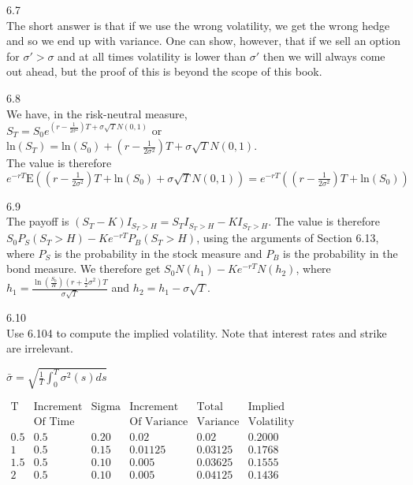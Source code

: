 6.7 \\
The short answer is that if we use the wrong volatility, we get the wrong hedge and so we end up with variance. One can show, however, that if we sell an option for $\sigma ' > \sigma$ and at all times volatility is lower than $\sigma '$ then we will always come out ahead, but the proof of this is beyond the scope of this book.

6.8 \\
We have, in the risk-neutral measure, \\
$S_T = S_0 e^{\left(r-\frac{1}{2 \sigma^2}  \right) T + \sigma \sqrt{T} N(0,1)}$ or \\
$\text{ln}(S_T) = \text{ln} (S_0) + \left(r-\frac{1}{2 \sigma^2}  \right) T + \sigma \sqrt{T} N(0,1)$. \\
The value is therefore \\
$e^{-rT} \text{E} \left( \left(r-\frac{1}{2 \sigma^2}  \right) T + \text{ln}(S_0) + \sigma \sqrt{T} N(0,1) \right) = e^{-rT} \left( \left(r-\frac{1}{2 \sigma^2}  \right) T + \text{ln}(S_0) \right)$

6.9 \\
The payoff is $(S_T - K)I_{S_T > H} = S_T I_{S_T > H} - K I_{S_T > H}$. The value is therefore $S_0 P_S (S_T > H) - K e^{-rT} P_B (S_T > H)$, using the arguments of Section 6.13, where $P_S$ is the probability in the stock measure and $P_B$ is the probability in the bond measure. We therefore get $S_0 N(h_1) - Ke^{-rT} N(h_2)$, where $h_1 = \frac{\ln \left( \frac{S_0}{H} \right) \left( r+\frac{1}{2}\sigma^2 \right)T}{\sigma \sqrt{T}}$ and $h_2 = h_1 - \sigma \sqrt{T}$.

6.10 \\
Use 6.104 to compute the implied volatility. Note that interest rates and strike are irrelevant.

$\bar{\sigma} = \sqrt{\frac{1}{T} \int_0^T \sigma^2 (s) ds}$

$
\begin{matrix}
\text{T} & \text{Increment} & \text{Sigma} & \text{Increment} & \text{Total} & \text{Implied} \\
\text{ } & \text{Of Time} & \text{ } & \text{Of Variance} & \text{Variance} & \text{Volatility} \\
0.5 & 0.5 & 0.20 & 0.02 & 0.02 & 0.2000 \\
1 & 0.5 & 0.15 & 0.01125 & 0.03125 & 0.1768 \\
1.5 & 0.5 & 0.10 & 0.005 & 0.03625 & 0.1555 \\
2 & 0.5 & 0.10 & 0.005 & 0.04125 & 0.1436
\end{matrix}
$

